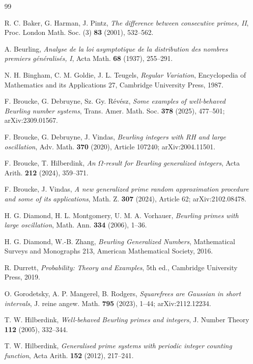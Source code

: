 \documentclass[11pt]{amsart}
\theoremstyle{remark}
\numberwithin{equation}{section}
\begin{document}
\begin{thebibliography}{99}

 R. C. Baker, G. Harman, J. Pintz, \emph{The difference between consecutive primes, II}, Proc. London Math. Soc. (3) \textbf{83} (2001), 532--562.

 A. Beurling, \emph{Analyse de la loi asymptotique de la distribution des nombres premiers g\'en\'eralis\'es, I}, Acta Math. \textbf{68} (1937), 255--291.

 N. H. Bingham, C. M. Goldie, J. L. Teugels, \emph{Regular Variation}, Encyclopedia of Mathematics and its Applications 27, Cambridge University Press, 1987.

 F. Broucke, G. Debruyne, Sz. Gy. R\'ev\'esz, \emph{Some examples of well-behaved Beurling number systems}, Trans. Amer. Math. Soc. \textbf{378} (2025), 477--501; arXiv:2309.01567.

 F. Broucke, G. Debruyne, J. Vindas, \emph{Beurling integers with RH and large oscillation}, Adv. Math. \textbf{370} (2020), Article 107240; arXiv:2004.11501.

 F. Broucke, T. Hilberdink, \emph{An $\Omega$-result for Beurling generalized integers}, Acta Arith. \textbf{212} (2024), 359--371.

 F. Broucke, J. Vindas, \emph{A new generalized prime random approximation procedure and some of its applications}, Math. Z. \textbf{307} (2024), Article 62; arXiv:2102.08478.

 H. G. Diamond, H. L. Montgomery, U. M. A. Vorhauer, \emph{Beurling primes with large oscillation}, Math. Ann. \textbf{334} (2006), 1--36.

 H. G. Diamond, W.-B. Zhang, \emph{Beurling Generalized Numbers}, Mathematical Surveys and Monographs 213, American Mathematical Society, 2016.

 R. Durrett, \emph{Probability: Theory and Examples}, 5th ed., Cambridge University Press, 2019.

 O. Gorodetsky, A. P. Mangerel, B. Rodgers, \emph{Squarefrees are Gaussian in short intervals}, J. reine angew. Math. \textbf{795} (2023), 1--44; arXiv:2112.12234.

 T. W. Hilberdink, \emph{Well-behaved Beurling primes and integers}, J. Number Theory \textbf{112} (2005), 332--344.

 T. W. Hilberdink, \emph{Generalised prime systems with periodic integer counting function}, Acta Arith. \textbf{152} (2012), 217--241.


\end{thebibliography}
\end{document}
